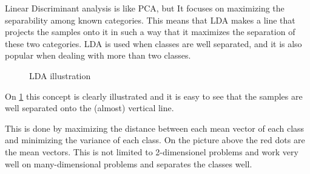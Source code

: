 Linear Discriminant analysis is like PCA, but It focuses on maximizing the separability among known categories. This means that LDA makes a line that projects the samples onto it in such a way that it maximizes the separation of these two categories. LDA is used when classes are well separated, and it is also popular when dealing with more than two classes.

\begin{figure}[H]
	\centering
	\caption{LDA illustration}
	\label{fig:LDA_illustration}
\end{figure}

On \cref{fig:LDA_illustration} this concept is clearly illustrated and it is easy to see that the samples are well separated onto the (almost) vertical line.

This is done by maximizing the distance between each mean vector of each class and minimizing the variance of each class. On the picture above the red dots are the mean vectors. This is not limited to 2-dimensionel problems and work very well on many-dimensional problems and separates the classes well.